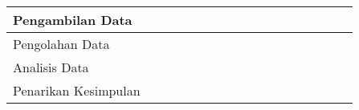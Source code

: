 \begin{table}[h!]
\begin{tabular}{|l|llll|llll|llll|llll|}
		Pengambilan Data                                 & \multicolumn{1}{c|}{}                         & \multicolumn{1}{c|}{}                         & \multicolumn{1}{c|}{\cellcolor[HTML]{9B9B9B}} & \multicolumn{1}{c|}{\cellcolor[HTML]{9B9B9B}} & \multicolumn{1}{c|}{\cellcolor[HTML]{9B9B9B}} & \multicolumn{1}{c|}{\cellcolor[HTML]{9B9B9B}} & \multicolumn{1}{c|}{}                         & \multicolumn{1}{c|}{}    & \multicolumn{1}{c|}{}                         & \multicolumn{1}{c|}{}                         & \multicolumn{1}{c|}{}                         & \multicolumn{1}{c|}{}    & \multicolumn{1}{c|}{}                         & \multicolumn{1}{c|}{}                         & \multicolumn{1}{c|}{}                         & \multicolumn{1}{c|}{}    \\ \hline
		Pengolahan Data                                  & \multicolumn{1}{l|}{}                         & \multicolumn{1}{l|}{}                         & \multicolumn{1}{l|}{}                         &                                               & \multicolumn{1}{l|}{}                         & \multicolumn{1}{l|}{\cellcolor[HTML]{9B9B9B}} & \multicolumn{1}{l|}{\cellcolor[HTML]{9B9B9B}} & \cellcolor[HTML]{9B9B9B} & \multicolumn{1}{l|}{\cellcolor[HTML]{9B9B9B}} & \multicolumn{1}{l|}{}                         & \multicolumn{1}{l|}{}                         &                          & \multicolumn{1}{l|}{}                         & \multicolumn{1}{l|}{}                         & \multicolumn{1}{l|}{}                         &                          \\ \hline
		Analisis Data                                    & \multicolumn{1}{l|}{}                         & \multicolumn{1}{l|}{}                         & \multicolumn{1}{l|}{}                         &                                               & \multicolumn{1}{l|}{}                         & \multicolumn{1}{l|}{}                         & \multicolumn{1}{l|}{}                         &                          & \multicolumn{1}{l|}{\cellcolor[HTML]{9B9B9B}} & \multicolumn{1}{l|}{\cellcolor[HTML]{9B9B9B}} & \multicolumn{1}{l|}{\cellcolor[HTML]{9B9B9B}} & \cellcolor[HTML]{9B9B9B} & \multicolumn{1}{l|}{}                         & \multicolumn{1}{l|}{}                         & \multicolumn{1}{l|}{}                         &                          \\ \hline
		Penarikan Kesimpulan                             & \multicolumn{1}{l|}{}                         & \multicolumn{1}{l|}{}                         & \multicolumn{1}{l|}{}                         &                                               & \multicolumn{1}{l|}{}                         & \multicolumn{1}{l|}{}                         & \multicolumn{1}{l|}{}                         &                          & \multicolumn{1}{l|}{}                         & \multicolumn{1}{l|}{}                         & \multicolumn{1}{l|}{}                         & \cellcolor[HTML]{9B9B9B} & \multicolumn{1}{l|}{\cellcolor[HTML]{9B9B9B}} & \multicolumn{1}{l|}{\cellcolor[HTML]{9B9B9B}} & \multicolumn{1}{l|}{}                         &                          \\ \hline

\end{tabular}
\end{table}
